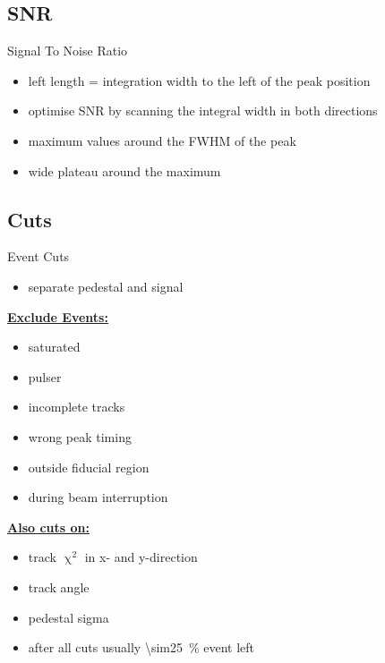 \subsection{SNR}
\begin{frame}{Signal To Noise Ratio}
	
	
	\begin{itemize}\itemfill
		\item left length = integration width to the left of the peak position
		\item optimise SNR by scanning the integral width in both directions
		\item maximum values around the FWHM of the peak
		\item wide plateau around the maximum
	\end{itemize}
 
\end{frame}
\subsection{Cuts}
\begin{frame}{Event Cuts}

	\begin{itemize}
		\item separate pedestal and signal
	\end{itemize}
	
	\begin{minipage}{.4\textwidth}
		\textbf{\underline{Exclude Events:}}
		\begin{itemize}
			\item saturated
			\item pulser
			\item incomplete tracks
			\item wrong peak timing
			\item outside fiducial region
			\item during beam interruption
		\end{itemize}\vspace*{5pt}
		\textbf{\underline{Also cuts on:}}
		\begin{itemize}
		 \item track $\upchi^2$ in x- and y-direction
		 \item track angle
		 \item pedestal sigma
		\end{itemize}
	\end{minipage}
	\hfill
	\begin{minipage}{.55\textwidth}
	\end{minipage}
	
	\begin{itemize}
		\item after all cuts usually \SI{\sim25}{\%} event left
	\end{itemize}


\end{frame}

